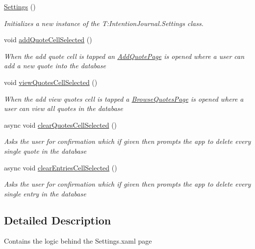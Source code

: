 \begin{DoxyCompactItemize}
\item 
\hyperlink{class_intention_journal_1_1_settings_a13d2ae82282bf0926f87aa6d029324af}{Settings} ()
\begin{DoxyCompactList}\small\item\em Initializes a new instance of the T\+:\+Intention\+Journal.\+Settings class. \end{DoxyCompactList}\item 
void \hyperlink{class_intention_journal_1_1_settings_a32b4275c128513b2bec1f877191cf298}{add\+Quote\+Cell\+Selected} ()
\begin{DoxyCompactList}\small\item\em When the add quote cell is tapped an \hyperlink{class_intention_journal_1_1_add_quote_page}{Add\+Quote\+Page} is opened where a user can add a new quote into the database \end{DoxyCompactList}\item 
void \hyperlink{class_intention_journal_1_1_settings_a3ce2745332e5e2492663772a5e175571}{view\+Quotes\+Cell\+Selected} ()
\begin{DoxyCompactList}\small\item\em When the add view quotes cell is tapped a \hyperlink{class_intention_journal_1_1_browse_quotes_page}{Browse\+Quotes\+Page} is opened where a user can view all quotes in the database \end{DoxyCompactList}\item 
async void \hyperlink{class_intention_journal_1_1_settings_a9d5692280c527423763874514f18c82d}{clear\+Quotes\+Cell\+Selected} ()
\begin{DoxyCompactList}\small\item\em Asks the user for confirmation which if given then prompts the app to delete every single quote in the database \end{DoxyCompactList}\item 
async void \hyperlink{class_intention_journal_1_1_settings_a947862ebd179256f826eebb99703a8a1}{clear\+Entries\+Cell\+Selected} ()
\begin{DoxyCompactList}\small\item\em Asks the user for confirmation which if given then prompts the app to delete every single entry in the database \end{DoxyCompactList}\end{DoxyCompactItemize}


\subsection{Detailed Description}
Contains the logic behind the Settings.\+xaml page 



